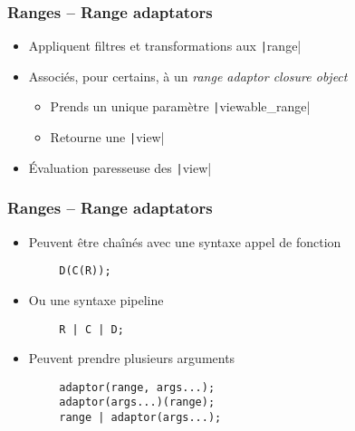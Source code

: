 \documentclass[C++.tex]{subfiles}
\begin{document}
\begin{frame}[fragile]
	\frametitle{Ranges -- Range adaptators}
	\begin{itemize}
		\item Appliquent filtres et transformations aux \texttt|range|
		\item Associés, pour certains, à un \textit{range adaptor closure object}
		\begin{itemize}
			\item Prends un unique paramètre \texttt|viewable_range|
			\item Retourne une \texttt|view|
		\end{itemize}
		\item Évaluation paresseuse des \texttt|view|
	\end{itemize}
\end{frame}

\begin{frame}[fragile]
	\frametitle{Ranges -- Range adaptators}
	\begin{itemize}
		\item Peuvent être chaînés avec une syntaxe \og appel de fonction\fg{}
	\end{itemize}

	\begin{verbatim}
		D(C(R));
	\end{verbatim}

	\begin{itemize}
		\item Ou une syntaxe \og pipeline\fg{}
	\end{itemize}

	\begin{verbatim}
		R | C | D;
	\end{verbatim}

	\begin{itemize}
		\item Peuvent prendre plusieurs arguments
	\end{itemize}

	\begin{verbatim}
		adaptor(range, args...);
		adaptor(args...)(range);
		range | adaptor(args...);
	\end{verbatim}

\end{frame}
\end{document}
